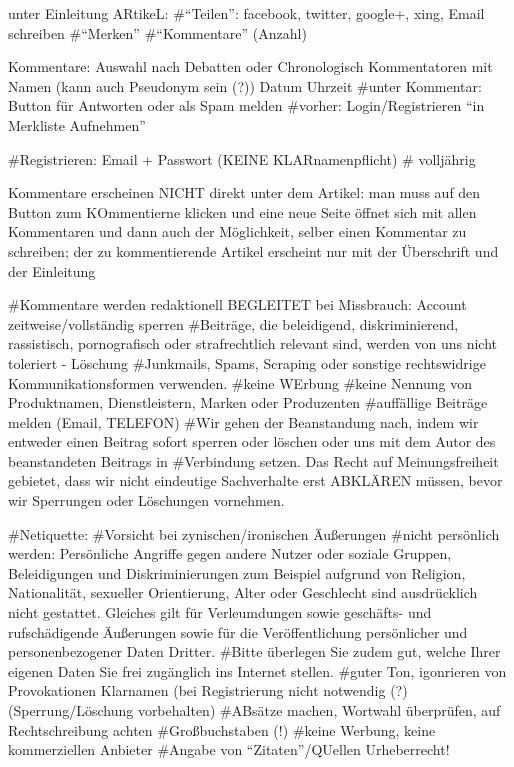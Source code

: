 unter Einleitung ARtikeL: 
	#``Teilen'': facebook, twitter, google+, xing, Email schreiben
	#``Merken''
	#``Kommentare'' (Anzahl)
	
Kommentare: Auswahl nach Debatten oder Chronologisch
	Kommentatoren mit Namen (kann auch Pseudonym sein (?)) Datum Uhrzeit
	#unter Kommentar: Button für Antworten oder als Spam melden
	#vorher: Login/Registrieren
	``in Merkliste Aufnehmen''
	
#Registrieren: Email + Passwort (KEINE KLARnamenpflicht)
#	volljährig




Kommentare erscheinen NICHT direkt unter dem Artikel: man muss auf den Button zum KOmmentierne klicken und eine neue Seite öffnet sich mit allen Kommentaren und dann auch der Möglichkeit, selber einen Kommentar zu schreiben; der zu kommentierende Artikel erscheint nur mit der Überschrift und der Einleitung


#Kommentare werden redaktionell BEGLEITET
bei Missbrauch: Account zeitweise/vollständig sperren
#Beiträge, die beleidigend, diskriminierend, rassistisch, pornografisch oder strafrechtlich relevant sind, werden von uns nicht toleriert - Löschung
#Junkmails, Spams, Scraping oder sonstige rechtswidrige Kommunikationsformen verwenden. 
#keine WErbung
#keine Nennung von Produktnamen, Dienstleistern, Marken oder Produzenten 
#auffällige Beiträge melden (Email, TELEFON)
#Wir gehen der Beanstandung nach, indem wir entweder einen Beitrag sofort sperren oder löschen oder uns mit dem Autor des beanstandeten Beitrags in #Verbindung setzen. Das Recht auf Meinungsfreiheit gebietet, dass wir nicht eindeutige Sachverhalte erst ABKLÄREN müssen, bevor wir Sperrungen oder Löschungen vornehmen.

#Netiquette:
	#Vorsicht bei zynischen/ironischen Äußerungen
	#nicht persönlich werden: Persönliche Angriffe gegen andere Nutzer oder soziale Gruppen, Beleidigungen und Diskriminierungen zum Beispiel aufgrund von Religion, Nationalität, sexueller Orientierung, Alter oder Geschlecht sind ausdrücklich nicht gestattet. Gleiches gilt für Verleumdungen sowie geschäfts- und rufschädigende Äußerungen sowie für die Veröffentlichung persönlicher und personenbezogener Daten Dritter. #Bitte überlegen Sie zudem gut, welche Ihrer eigenen Daten Sie frei zugänglich ins Internet stellen.
	#guter Ton, igonrieren von Provokationen
	Klarnamen (bei Registrierung nicht notwendig (?) (Sperrung/Löschung vorbehalten)
	#ABsätze machen, Wortwahl überprüfen, auf Rechtschreibung achten
	#Großbuchstaben (!)
	#keine Werbung, keine kommerziellen Anbieter
	#Angabe von ``Zitaten''/QUellen
	Urheberrecht!
	
